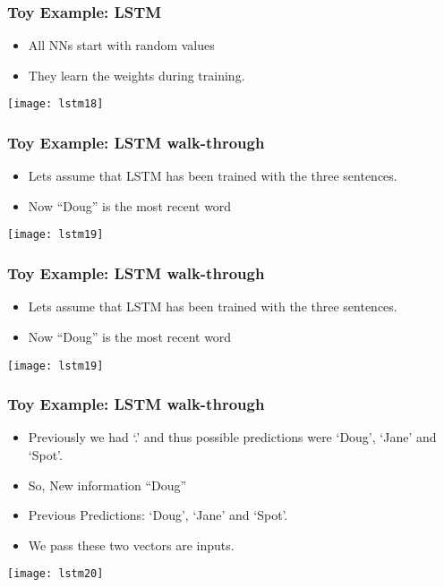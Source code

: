 \begin{frame}[fragile] \frametitle{Toy Example: LSTM}
\begin{itemize}
\item All NNs start with random values
\item They learn the weights during training.
\end{itemize}
\begin{center}
\texttt{[image: lstm18]}
\end{center}
\end{frame}

\begin{frame}[fragile] \frametitle{Toy Example: LSTM walk-through}
\begin{itemize}
\item Lets assume that LSTM has been trained with the three sentences.
\item Now ``Doug'' is the most recent word
\end{itemize}
\begin{center}
\texttt{[image: lstm19]}
\end{center}
\end{frame}

\begin{frame}[fragile] \frametitle{Toy Example: LSTM walk-through}
\begin{itemize}
\item Lets assume that LSTM has been trained with the three sentences.
\item Now ``Doug'' is the most recent word
\end{itemize}
\begin{center}
\texttt{[image: lstm19]}
\end{center}
\end{frame}


\begin{frame}[fragile] \frametitle{Toy Example: LSTM walk-through}
\begin{itemize}
\item  Previously we had `.' and thus possible predictions were `Doug', `Jane' and `Spot'.
\item So, New information ``Doug''
\item Previous Predictions: `Doug', `Jane' and `Spot'.
\item We pass these two vectors are inputs.
\end{itemize}
\begin{center}
\texttt{[image: lstm20]}
\end{center}
\end{frame}


